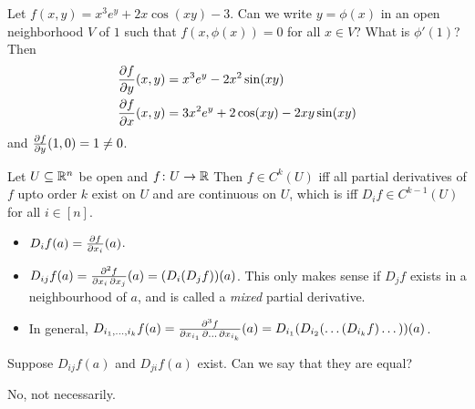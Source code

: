 \begin{example}
    Let $f(x, y) = x^3 e^y + 2x \cos(xy) - 3$.
    Can we write $y = \phi(x)$ in an open neighborhood $V$ of $1$ such that
    $f(x, \phi(x)) = 0$ for all $x \in V$?
    What is $\phi'(1)$?
    Then \begin{align*}
        \pdv{f}{y}(x, y) &= x^3 e^y - 2x^2 \sin(xy) \\
        \pdv{f}{x}(x, y) &= 3x^2 e^y + 2 \cos(xy) - 2xy \sin(xy)
    \end{align*}
    and $\pdv{f}{y}(1, 0) = 1 \ne 0$.
\end{example}

Let $U \subseteq \mathbb{R}^n$ be open and $f\colon U \to \mathbb{R}$
Then $f \in C^k(U)$ iff all partial derivatives of $f$ upto order $k$ exist
on $U$ and are continuous on $U$, which is iff $D_i f \in C^{k-1}(U)$ for
all $i \in [n]$.

\begin{notation} \leavevmode
    \begin{itemize}
        \item $D_if(a) = \pdv{f}{x_i}(a)$.
        \item $D_{ij}f(a) = \pdv{f}{x_i, x_j}(a) = (D_i(D_jf))(a)$.
        This only makes sense if $D_jf$ exists in a neighbourhood of $a$,
        and is called a \emph{mixed} partial derivative.
        \item In general,
        $D_{i_1, \dots, i_k}f(a) = \pdv{f}{x_{i_1}, \dots, x_{i_k}}(a)
        = D_{i_1}(D_{i_2}(\dots(D_{i_k}f)\dots))(a)$.
    \end{itemize}
\end{notation}

\begin{question}
    Suppose $D_{ij}f(a)$ and $D_{ji}f(a)$ exist.
    Can we say that they are equal?
\end{question}
\begin{solution}
    No, not necessarily.
    \TODO
\end{solution}

